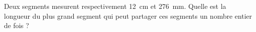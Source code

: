 
Deux segments mesurent respectivement 12~cm et 276~mm. Quelle est la longueur du plus grand segment qui peut partager ces segments un nombre entier de fois ?
